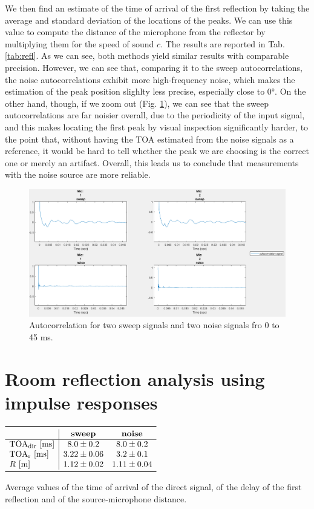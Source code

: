 \documentclass[a4paper]{article}
\begin{document}
We then find an estimate of the time of arrival of the first reflection by taking the average and standard deviation of the locations of the peaks.  We can use this value to compute the distance of the microphone from the reflector by multiplying them for the speed of sound $c$. The results are reported in Tab. \ref{tab:refl}. As we can see, both methods yield similar results with comparable precision. However, we can see that, comparing it to the  sweep autocorrelations, the noise autocorrelations exhibit more high-frequency noise, which makes the estimation of the peak position slighlty less precise, especially close to 0°. On the other hand, though, if we zoom out (Fig. \ref{fig:autocorr}), we can see that the sweep autocorrelations are far noisier overall, due to the periodicity of the input signal, and this makes locating the first peak by visual inspection significantly harder, to the point that, without having the TOA estimated from the noise signals as a reference, it would be hard to tell whether the peak we are choosing is the correct one or merely an artifact. Overall, this leads us to conclude that measurements with the noise source are more reliable.


\begin{figure}
	\centering
	\includegraphics[width=0.75\linewidth]{autocorrelation.png}
	\caption{Autocorrelation for two sweep signals and two noise signals fro 0 to 45 ms.}
	\label{fig:autocorr}
\end{figure}

\section{Room reflection analysis using impulse responses}

\begin{table}[h!]
	\centering
	$\begin{array}{l|cc}
		\toprule
		& \text{\textbf{sweep}} & \text{\textbf{noise}} \\
		\hline
		\text{TOA\textsubscript{dir} [ms]} & 8.0 \pm 0.2 & 8.0 \pm 0.2\\
		\text{TOA\textsubscript{r} [ms]} & 3.22 \pm 0.06  & 3.2 \pm 0.1\\
		R \text{ [m]} & 1.12 \pm 0.02 & 1.11 \pm 0.04 \\
		\bottomrule
	\end{array}$
	\caption{Average values of the time of arrival of the direct signal, of the delay of the first reflection and of the source-microphone distance. }
	\label{tab:ir}
\end{table}
\end{document}
